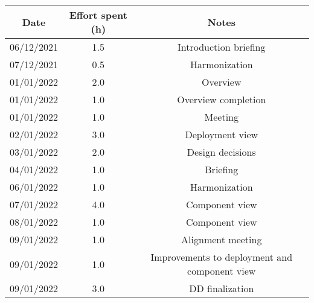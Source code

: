 \documentclass[../../main.tex]{subfiles}
\begin{document}
    \begin{center}
        \begin{tabular}{|c| |c| |c|} 
            \hline
            Date & Effort spent (h) & Notes\\ [0.5ex] 
            \hline\hline
            06/12/2021 & 1.5 & Introduction briefing\\ 
            07/12/2021 & 0.5 & Harmonization\\
            01/01/2022 & 2.0 & Overview\\
            01/01/2022 & 1.0 & Overview completion\\
            01/01/2022 & 1.0 & Meeting\\
            02/01/2022 & 3.0 & Deployment view\\
            03/01/2022 & 2.0 & Design decisions\\
            04/01/2022 & 1.0 & Briefing\\
            06/01/2022 & 1.0 & Harmonization\\
            07/01/2022 & 4.0 & Component view\\
            08/01/2022 & 1.0 & Component view\\
            09/01/2022 & 1.0 & Alignment meeting\\
            09/01/2022 & 1.0 & Improvements to deployment and component view\\
            09/01/2022 & 3.0 & DD finalization\\
            \hline
        \end{tabular}
    \end{center}
\end{document}
